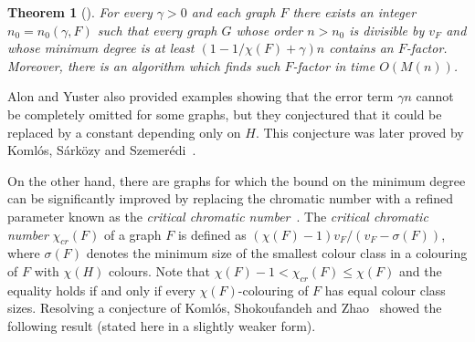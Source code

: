 \documentclass[11pt, letterpaper]{amsart}
\theoremstyle{plain}
\numberwithin{equation}{section}
\newtheorem{theorem}[thm]{Theorem}
\theoremstyle{definition}
\begin{document}
    \begin{theorem}[\cite{alon1996h}]\label{alon-chromatic number}
        For every \(\gamma>0\) and each graph \(F\) there exists an integer \(n_0=n_0(\gamma,F)\) such that every graph \(G\) whose order \(n>n_0\) is divisible by \(v_F\) and whose minimum degree is at least \(\left(1-1/\chi(F)+\gamma\right)n\) contains an \(F\)-factor. Moreover, there is an algorithm which finds such \(F\)-factor in time \(O(M(n))\).
    \end{theorem}

    Alon and Yuster also provided examples showing that the error term \(\gamma n\) cannot be completely omitted for some graphs, but they conjectured that it could be replaced by a constant depending only on \(H\). 
    This conjecture was later proved by Koml\'{o}s, S\'{a}rk\"{o}zy and Szemer\'{e}di~\cite{komlos2001proof}.

    \iffalse
    \begin{theorem}[\cite{komlos2001proof}]\label{chromatic number}
        For every graph \(F\) there exist integers \(C<v_F\) and \(n_0=n_0(\gamma,F)\) such that every graph \(G\) whose order \(n>n_0\) is divisible by \(v_F\) and whose minimum degree is at least \(\left(1-1/\chi(F)\right)n+C\) contains an \(F\)-factor. Moreover, there is an algorithm which finds such \(F\)-factor in time \(O(nM(n))\).
    \end{theorem}
    \fi
    On the other hand, there are graphs for which the bound on the minimum degree can be significantly improved by replacing the chromatic number with a refined parameter known as the \emph{critical chromatic number}~\cite{cooley2007perfect}.
    The \emph{critical chromatic number} \(\chi_{cr}(F)\) of a graph \(F\) is defined as \(\left(\chi(F)-1\right)v_F/\left(v_F-\sigma(F)\right)\), where \(\sigma(F)\) denotes the  minimum size of the smallest colour class in a colouring of \(F\) with \(\chi(H)\) colours. 
    Note that \(\chi(F)-1<\chi_{cr}(F)\le \chi(F)\) and the equality holds if and only if every \(\chi(F)\)-colouring of \(F\) has equal colour class sizes. 
    Resolving a conjecture of Koml\'{o}s, Shokoufandeh and Zhao~\cite{shokoufandeh2003proof} showed the following result (stated here in a slightly weaker form).
\end{document}
